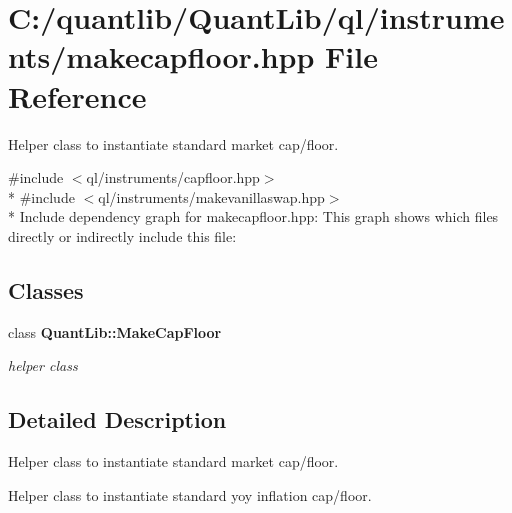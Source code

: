 \section{C\+:/quantlib/\+Quant\+Lib/ql/instruments/makecapfloor.hpp File Reference}
\label{makecapfloor_8hpp}


Helper class to instantiate standard market cap/floor.  


{\ttfamily \#include $<$ql/instruments/capfloor.\+hpp$>$}\\*
{\ttfamily \#include $<$ql/instruments/makevanillaswap.\+hpp$>$}\\*
Include dependency graph for makecapfloor.\+hpp\+:
This graph shows which files directly or indirectly include this file\+:
\subsection*{Classes}
\begin{DoxyCompactItemize}
\item 
class {\bf Quant\+Lib\+::\+Make\+Cap\+Floor}
\begin{DoxyCompactList}\small\item\em helper class \end{DoxyCompactList}\end{DoxyCompactItemize}


\subsection{Detailed Description}
Helper class to instantiate standard market cap/floor. 

Helper class to instantiate standard yoy inflation cap/floor.